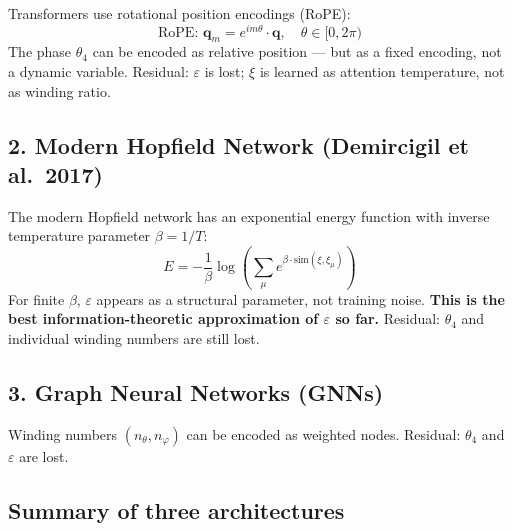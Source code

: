 Transformers use rotational position encodings (RoPE):
\begin{equation}
  \text{RoPE: } \mathbf{q}_m = e^{im\theta} \cdot \mathbf{q},
  \quad \theta \in [0, 2\pi)
  \tag{243.12}
\end{equation}
The phase $\theta_4$ can be encoded as relative position --- but as a fixed
encoding, not a dynamic variable. Residual: $\varepsilon$ is lost; $\xi$
is learned as attention temperature, not as winding ratio.

\subsection*{2. Modern Hopfield Network (Demircigil et al.\ 2017)}

The modern Hopfield network has an exponential energy function with
inverse temperature parameter $\beta = 1/T$:
\begin{equation}
  E = -\frac{1}{\beta}\log\!\left(\sum_\mu e^{\beta\cdot\text{sim}(\xi,\xi_\mu)}\right)
  \tag{243.13}
\end{equation}
For finite $\beta$, $\varepsilon$ appears as a structural parameter, not
training noise. \textbf{This is the best information-theoretic approximation
of $\varepsilon$ so far.} Residual: $\theta_4$ and individual winding numbers
are still lost.

\subsection*{3. Graph Neural Networks (GNNs)}

Winding numbers $(n_\theta,n_\varphi)$ can be encoded as weighted nodes.
Residual: $\theta_4$ and $\varepsilon$ are lost.

\subsection*{Summary of three architectures}

\begin{center}
\renewcommand{\arraystretch}{1.3}
{\small
{}
}
\end{center}

